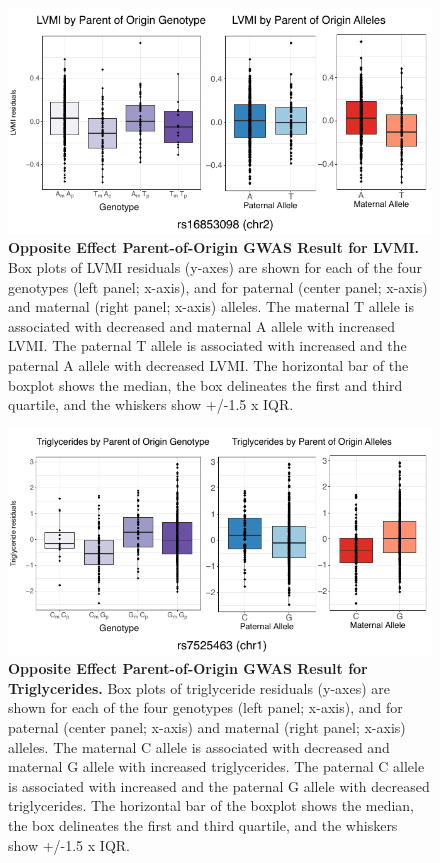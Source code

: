 \begin{figure}[!htb]
\centering
\includegraphics[width=5in]{img/ch02/fig-s9.pdf}
\caption[Opposite Effect Parent-of-Origin GWAS Result for LVMI.]{\textbf{Opposite Effect Parent-of-Origin GWAS Result for LVMI.}  Box plots of LVMI residuals (y-axes) are shown for each of the four genotypes (left panel; x-axis), and for paternal (center panel; x-axis) and maternal (right panel; x-axis) alleles. The maternal T allele is associated with decreased and maternal A allele with increased LVMI. The paternal T allele is associated with increased and the paternal A allele with decreased LVMI. The horizontal bar of the boxplot shows the median, the box delineates the first and third quartile, and the whiskers show +/-1.5 x IQR.}
\label{fig:fig-s9}
\end{figure}

\begin{figure}[!htb]
\centering
\includegraphics[width=5in]{img/ch02/fig-s10.pdf}
\caption[Opposite Effect Parent-of-Origin GWAS Result for Triglycerides.]{\textbf{Opposite Effect Parent-of-Origin GWAS Result for Triglycerides.}  Box plots of triglyceride residuals (y-axes) are shown for each of the four genotypes (left panel; x-axis), and for paternal (center panel; x-axis) and maternal (right panel; x-axis) alleles. The maternal C allele is associated with decreased and maternal G allele with increased triglycerides. The paternal C allele is associated with increased and the paternal G allele with decreased triglycerides. The horizontal bar of the boxplot shows the median, the box delineates the first and third quartile, and the whiskers show +/-1.5 x IQR.}
\label{fig:fig-s10}
\end{figure}

